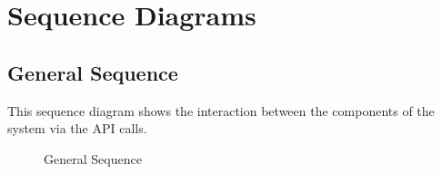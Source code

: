 \section{Sequence Diagrams}

\subsection{General Sequence}
This sequence diagram shows the interaction between the components of the system via the API calls.
\begin{figure}[!htb]
    \centering
    \caption{General Sequence}
    \label{fig:seq-general}
\end{figure}

